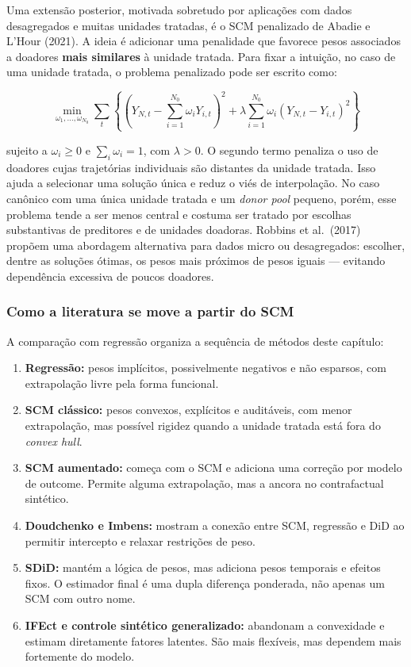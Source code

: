 \documentclass[
]{article}
\providecommand{\tightlist}{%
  \setlength{\itemsep}{0pt}\setlength{\parskip}{0pt}}
\begin{document}
Uma extensão posterior, motivada sobretudo por aplicações com dados desagregados e muitas unidades tratadas, é o SCM penalizado de Abadie e L'Hour (2021). A ideia é adicionar uma penalidade que favorece pesos associados a doadores \textbf{mais similares} à unidade tratada. Para fixar a intuição, no caso de uma unidade tratada, o problema penalizado pode ser escrito como:

\[
\min_{\omega_1, \ldots, \omega_{N_0}} \sum_t \left\{ \left(Y_{N,t} - \sum_{i=1}^{N_0} \omega_i Y_{i,t}\right)^2 + \lambda \sum_{i=1}^{N_0} \omega_i (Y_{N,t} - Y_{i,t})^2 \right\}
\]

sujeito a \(\omega_i \geq 0\) e \(\sum_i \omega_i = 1\), com \(\lambda > 0\). O segundo termo penaliza o uso de doadores cujas trajetórias individuais são distantes da unidade tratada. Isso ajuda a selecionar uma solução única e reduz o viés de interpolação. No caso canônico com uma única unidade tratada e um \emph{donor pool} pequeno, porém, esse problema tende a ser menos central e costuma ser tratado por escolhas substantivas de preditores e de unidades doadoras. Robbins et al.~(2017) propõem uma abordagem alternativa para dados micro ou desagregados: escolher, dentre as soluções ótimas, os pesos mais próximos de pesos iguais --- evitando dependência excessiva de poucos doadores.

\subsubsection{Como a literatura se move a partir do SCM}\label{como-a-literatura-se-move-a-partir-do-scm}

A comparação com regressão organiza a sequência de métodos deste capítulo:

\begin{enumerate}
\def\labelenumi{\arabic{enumi}.}
\tightlist
\item
  \textbf{Regressão:} pesos implícitos, possivelmente negativos e não esparsos, com extrapolação livre pela forma funcional.
\item
  \textbf{SCM clássico:} pesos convexos, explícitos e auditáveis, com menor extrapolação, mas possível rigidez quando a unidade tratada está fora do \emph{convex hull}.
\item
  \textbf{SCM aumentado:} começa com o SCM e adiciona uma correção por modelo de outcome. Permite alguma extrapolação, mas a ancora no contrafactual sintético.
\item
  \textbf{Doudchenko e Imbens:} mostram a conexão entre SCM, regressão e DiD ao permitir intercepto e relaxar restrições de peso.
\item
  \textbf{SDiD:} mantém a lógica de pesos, mas adiciona pesos temporais e efeitos fixos. O estimador final é uma dupla diferença ponderada, não apenas um SCM com outro nome.
\item
  \textbf{IFEct e controle sintético generalizado:} abandonam a convexidade e estimam diretamente fatores latentes. São mais flexíveis, mas dependem mais fortemente do modelo.
\end{enumerate}
\end{document}
